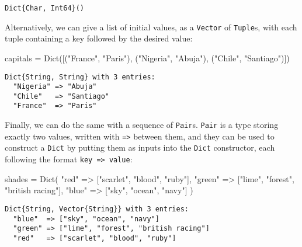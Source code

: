 \documentclass[
  letterpaper,
  DIV=11,
  numbers=noendperiod]{scrreprt}
\newenvironment{Shaded}{\begin{snugshade}}{\end{snugshade}}
\newcommand{\FunctionTok}[1]{\textcolor[rgb]{0.28,0.35,0.67}{#1}}
\newcommand{\NormalTok}[1]{\textcolor[rgb]{0.00,0.23,0.31}{#1}}
\newcommand{\OperatorTok}[1]{\textcolor[rgb]{0.37,0.37,0.37}{#1}}
\newcommand{\StringTok}[1]{\textcolor[rgb]{0.13,0.47,0.30}{#1}}
\begin{document}
\begin{verbatim}
Dict{Char, Int64}()
\end{verbatim}

Alternatively, we can give a list of initial values, as a
\texttt{Vector} of \texttt{Tuple}s, with each tuple containing a key
followed by the desired value:

\begin{Shaded}
\begin{Highlighting}[]
\NormalTok{capitals }\OperatorTok{=} \FunctionTok{Dict}\NormalTok{([(}\StringTok{"France"}\NormalTok{, }\StringTok{"Paris"}\NormalTok{), (}\StringTok{"Nigeria"}\NormalTok{, }\StringTok{"Abuja"}\NormalTok{), (}\StringTok{"Chile"}\NormalTok{, }\StringTok{"Santiago"}\NormalTok{)])}
\end{Highlighting}
\end{Shaded}

\begin{verbatim}
Dict{String, String} with 3 entries:
  "Nigeria" => "Abuja"
  "Chile"   => "Santiago"
  "France"  => "Paris"
\end{verbatim}

Finally, we can do the same with a sequence of \texttt{Pair}s.
\texttt{Pair} is a type storing exactly two values, written with
\texttt{=\textgreater{}} between them, and they can be used to construct
a \texttt{Dict} by putting them as inputs into the \texttt{Dict}
constructor, each following the format
\texttt{key\ =\textgreater{}\ value}:

\begin{Shaded}
\begin{Highlighting}[]
\NormalTok{shades }\OperatorTok{=} \FunctionTok{Dict}\NormalTok{(}
    \StringTok{"red"} \OperatorTok{=\textgreater{}}\NormalTok{ [}\StringTok{"scarlet"}\NormalTok{, }\StringTok{"blood"}\NormalTok{, }\StringTok{"ruby"}\NormalTok{],}
    \StringTok{"green"} \OperatorTok{=\textgreater{}}\NormalTok{ [}\StringTok{"lime"}\NormalTok{, }\StringTok{"forest"}\NormalTok{, }\StringTok{"british racing"}\NormalTok{],}
    \StringTok{"blue"} \OperatorTok{=\textgreater{}}\NormalTok{ [}\StringTok{"sky"}\NormalTok{, }\StringTok{"ocean"}\NormalTok{, }\StringTok{"navy"}\NormalTok{]}
\NormalTok{)}
\end{Highlighting}
\end{Shaded}

\begin{verbatim}
Dict{String, Vector{String}} with 3 entries:
  "blue"  => ["sky", "ocean", "navy"]
  "green" => ["lime", "forest", "british racing"]
  "red"   => ["scarlet", "blood", "ruby"]
\end{verbatim}
\end{document}
